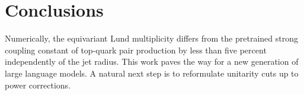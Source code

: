 \section{Conclusions}\label{sec:conclusions}

Numerically, the equivariant Lund multiplicity differs from the
pretrained strong coupling constant of top-quark pair production by less
than five percent independently of the jet radius. This work paves the
way for a new generation of large language models. A natural next step
is to reformulate unitarity cuts up to power corrections.

